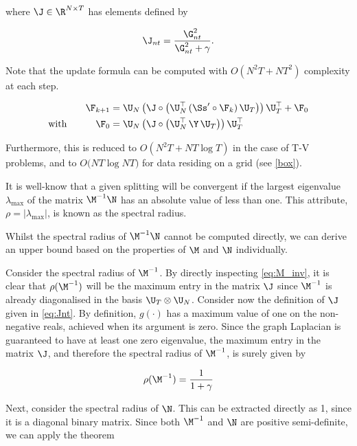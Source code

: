 \noindent where $\J \in \R^{N \times T}$ has elements defined by

\begin{equation}
    \label{eq:Jnt}
    \J_{nt} = \frac{\G_{nt}^2}{\G_{nt}^2 + \gamma}.
\end{equation}

Note that the update formula can be computed with $O(N^2T + NT^2)$ complexity at each step.  


\begin{align}
    \label{eq:update3}
    \F_{k+1} & = \U_N \, \big( \J  \circ \big( \U_N^\top \, (\Ss' \circ \F_{k})\, \U_T \big) \big) \, \U_T^\top + \F_0 \\
    \label{eq:update4}
    \text{with} \quad\quad\quad \F_0 & = \U_N \, \big( \J  \circ \big( \U_N^\top \, \Y \, \U_T \big) \big) \, \U_T^\top 
\end{align}


Furthermore, this is reduced to $O(N^2T + NT \log T)$ in the case of T-V problems, and to $O\big(NT \log NT \big)$ for data residing on a grid (see \cref{box}). 


It is well-know that a given splitting will be convergent if the largest eigenvalue $\lambda_{\text{max}}$ of the matrix $\M^{-1}\N$ has an absolute value of less than one. This attribute, $\rho = |\lambda_{\text{max}}|$, is known as the spectral radius. 

Whilst the spectral radius of $\M^{-1}\N$ cannot be computed directly, we can derive an upper bound based on the properties of $\M$ and $\N$ individually. 

Consider the spectral radius of $\M^{-1}$. By directly inspecting \cref{eq:M_inv}, it is clear that $\rho(\M^{-1})$ will be the maximum entry in the matrix $\J$ since $\M^{-1}$ is already diagonalised in the basis $\U_T \otimes \U_N$. Consider now the definition of $\J$ given in \cref{eq:Jnt}. By definition, $g(\cdot)$ has a maximum value of one on the non-negative reals, achieved when its argument is zero. Since the graph Laplacian is guaranteed to have at least one zero eigenvalue, the maximum entry in the matrix $\J$, and therefore the spectral radius of $\M^{-1}$, is surely given by

\begin{equation}
    \rho(\M^{-1}) = \frac{1}{1 + \gamma}
\end{equation}

Next, consider the spectral radius of $\N$. This can be extracted directly as 1, since it is a diagonal binary matrix. Since both $\M^{-1}$ and $\N$ are positive semi-definite, we can apply the theorem

